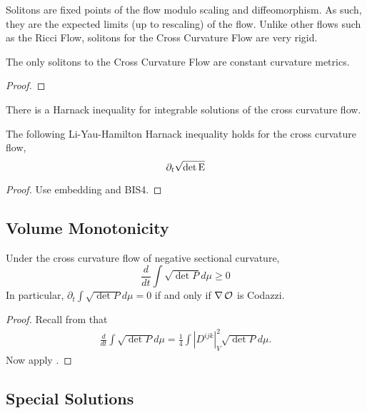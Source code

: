 \documentclass[a4paper, 12pt]{amsart}
\begin{document}
Solitons are fixed points of the flow modulo scaling and diffeomorphism. As such, they are the expected limits (up to rescaling) of the flow. Unlike other flows such as the Ricci Flow, solitons for the Cross Curvature Flow are very rigid.

\begin{lemma}
The only solitons to the Cross Curvature Flow are constant curvature metrics.
\end{lemma}

\begin{proof}

\end{proof}

There is a Harnack inequality for integrable solutions of the cross curvature flow.

\begin{lemma}
\label{lem:harnack}

The following Li-Yau-Hamilton Harnack inequality holds for the cross curvature flow,
\[
\partial_t \sqrt{\det \operatorname{E}}
\]
\end{lemma}

\begin{proof}
{\color{red}Use embedding and BIS4.}
\end{proof}

\subsection{Volume Monotonicity}
\label{subsec:xcf_volume}

\begin{lemma}
\label{lem:volume_monotonicity}

Under the cross curvature flow of negative sectional curvature,
\[
\frac{d}{dt}\int \sqrt{\det P}d\mu \geq 0
\]
In particular, \(\partial_t \int \sqrt{\det P}d\mu = 0\) if and only if \(\nabla \operatorname{\mathcal{O}}\) is Codazzi.
\end{lemma}

\begin{proof}
Recall from \cite[page 6]{MR2055396} that
\begin{align}
\frac{d}{dt}\int \sqrt{\det P}d\mu=\frac{1}{4}\int |D^{ijk}|_V^2\sqrt{\det P}d\mu.
\end{align}
Now apply .
\end{proof}

\subsection{Special Solutions}
\label{subsec:xcf_special}
\end{document}
